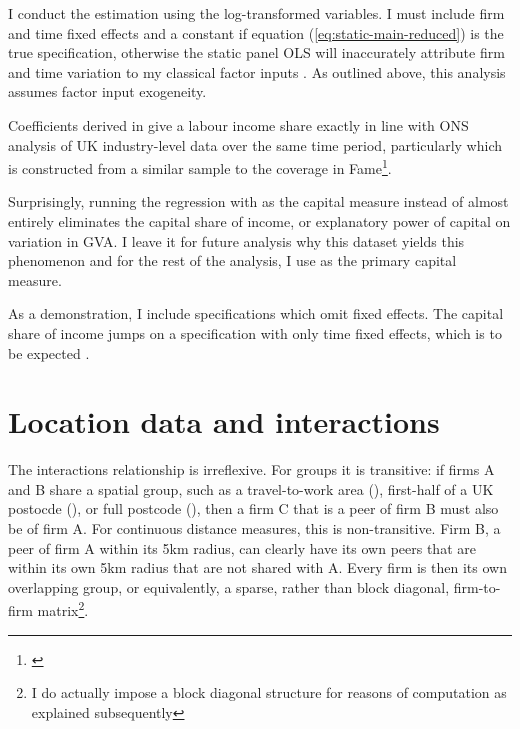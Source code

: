 I conduct the estimation using the log-transformed variables.
I must include firm and time fixed effects and a constant
if equation (\ref{eq:static-main-reduced}) is the true specification,
otherwise the static panel OLS will inaccurately attribute firm and time variation
to my classical factor inputs .
As outlined above, this analysis assumes factor input exogeneity.
\par
Coefficients derived in  give a labour income share
exactly in line with ONS analysis of UK industry-level data
over the same time period, particularly  which is constructed
from a similar sample to the coverage in Fame\footnote{\cite{OfficeforNationalStatistics2024}}.
\par
Surprisingly, running the regression with  as the capital measure instead of 
almost entirely eliminates the capital share of income, or explanatory power of capital on variation in GVA.
I leave it for future analysis why this dataset yields this phenomenon and
for the rest of the analysis, I use  as the primary capital measure.
\par
As a demonstration, I include specifications which omit fixed effects.
The capital share of income jumps on a specification with only time fixed effects,
which is to be expected .


\section{Location data and interactions}
\label{s:data-location}

The interactions relationship is irreflexive. For groups it is transitive:
if firms A and B share a spatial group, such as a travel-to-work area (),
first-half of a UK postocde (), or full postcode (),
then a firm C that is a peer of firm B must also be of firm A.
For continuous distance measures, this is non-transitive.
Firm B, a peer of firm A within its 5km radius, can clearly have its own peers
that are within its own 5km radius that are not shared with A.
Every firm is then its own overlapping group, or equivalently,
a sparse, rather than block diagonal, firm-to-firm matrix\footnote{
    I do actually impose a block diagonal structure for reasons of computation
    as explained subsequently
}.

